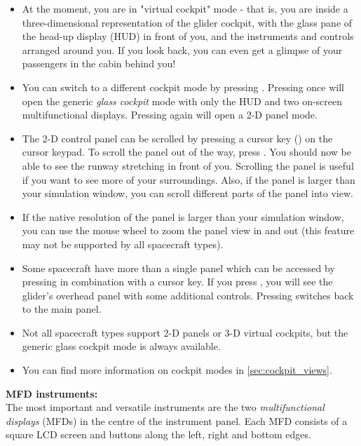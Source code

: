 \documentclass[Orbiter User Manual.tex]{subfiles}
\begin{document}
\begin{itemize}
\item At the moment, you are in "virtual cockpit" mode - that is, you are inside a three-dimensional representation of the glider cockpit, with the glass pane of the head-up display (HUD) in front of you, and the instruments and controls arranged around you. If you look back, you can even get a glimpse of your passengers in the cabin behind you!
\item You can switch to a different cockpit mode by pressing . Pressing  once will open the generic \textit{glass cockpit} mode with only the HUD and two on-screen multifunctional displays. Pressing  again will open a 2-D panel mode.
\item The 2-D control panel can be scrolled by pressing a cursor key (\DArrow\UArrow\RArrow\LArrow) on the cursor keypad. To scroll the panel out of the way, press \UArrow. You should now be able to see the runway stretching in front of you. Scrolling the panel is useful if you want to see more of your surroundings. Also, if the panel is larger than your simulation window, you can scroll different parts of the panel into view.
\item If the native resolution of the panel is larger than your simulation window, you can use the mouse wheel to zoom the panel view in and out (this feature may not be supported by all spacecraft types).
\item Some spacecraft have more than a single panel which can be accessed by pressing \Ctrl in combination with a cursor key. If you press \Ctrl\UArrow, you will see the glider's overhead panel with some additional controls. Pressing \Ctrl\DArrow switches back to the main panel.
\item Not all spacecraft types support 2-D panels or 3-D virtual cockpits, but the generic glass cockpit mode is always available.
\item You can find more information on cockpit modes in \ref{sec:cockpit_views}.
\end{itemize}

\noindent
\textbf{MFD instruments:}\\
The most important and versatile instruments are the two \textit{multifunctional displays} (MFDs) in the centre of the instrument panel. Each MFD consists of a square LCD screen and buttons along the left, right and bottom edges.
\end{document}
